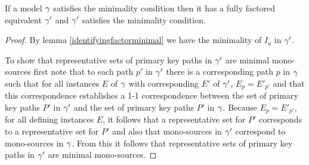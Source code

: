 \begin{lemma}
If a model $\gamma$ satisfies the minimality condition then it has a fully factored
equivalent $\gamma'$  and $\gamma'$ satisfies the minimality condition. 
\end{lemma}
\begin{proof}
By lemma \ref{identifyingfactorminimal} we have the minimality of $I_a$ in $\gamma'$.

To show that representative sets of primary key paths in $\gamma'$ are minimal mono-sources
first note that to each path $p'$ in $\gamma'$ there is a corresponding path 
$p$ in $\gamma$  
 such that for all instances $E$ of $\gamma$ with corresponding $E'$ of $\gamma'$, 
$E_p=E'_{p'}$ and that this correspondence establishes a 1-1 correspondence between the set of primary key paths $P'$ in $\gamma'$
and the set of primary key paths $P'$ in $\gamma$. Because $E_p=E'_{p'}$, for all defining instances
$E$, it follows that a representative set for $P'$ corresponds to a representative set for $P'$ and also
that mono-sources in $\gamma'$ correspond to mono-sources in $\gamma$. From this it follows that representative sets of primary key paths in $\gamma'$ are minimal mono-sources.
\end{proof}
